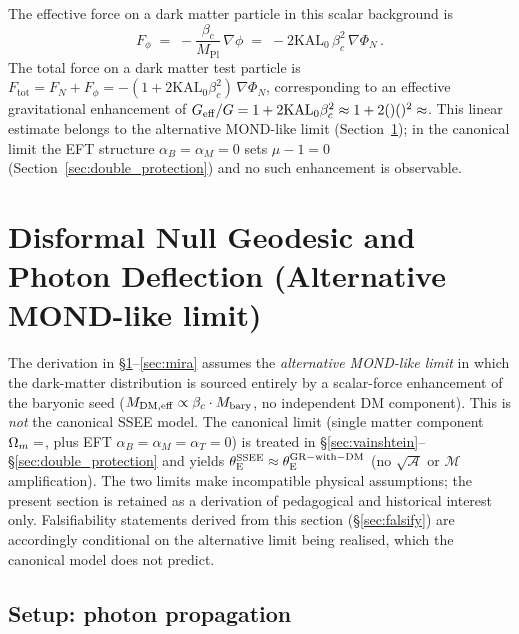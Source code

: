 \documentclass[12pt,a4paper]{article}
\newcommand{\KAL}{\mathrm{KAL}_0}
\newcommand{\MIRA}{\mathcal{M}}
\newcommand{\AURA}{\mathcal{A}}
\newcommand{\Mpl}{M_{\mathrm{Pl}}}
\newcommand{\bc}{\beta_c}
\newcommand{\thetaE}{\theta_{\mathrm{E}}}
\begin{document}
The effective force on a dark matter particle in this scalar background is
\begin{equation}
  F_\phi \;=\; -\frac{\bc}{\Mpl}\,\nabla\phi
         \;=\; -2\KAL\,\bc^2\,\nabla\Phi_N\,.
  \label{eq:scalar_force}
\end{equation}
The total force on a dark matter test particle is
$F_{\mathrm{tot}} = F_N + F_\phi = -(1 + 2\KAL\bc^2)\,\nabla\Phi_N$,
corresponding to an effective gravitational enhancement of
$G_{\mathrm{eff}}/G = 1 + 2\KAL\bc^2 \approx 1 + 2(\val{KAL0_d3})(\val{AURA_d3})^2
\approx \val{p8_Geff}$.
This linear estimate belongs to the alternative MOND-like limit
(Section~\ref{sec:geodesic}); in the canonical limit the EFT structure
$\alpha_B=\alpha_M=0$ sets $\mu-1=0$ (Section~\ref{sec:double_protection})
and no such enhancement is observable.

\section{Disformal Null Geodesic and Photon Deflection (Alternative MOND-like limit)}
\label{sec:geodesic}

\begin{tcolorbox}[colback=yellow!8,colframe=orange!60,title=Scope of this section]
The derivation in \S\ref{sec:geodesic}--\ref{sec:mira} assumes the
\emph{alternative MOND-like limit} in which the dark-matter distribution is
sourced entirely by a scalar-force enhancement of the baryonic seed
($M_{\rm DM,eff}\propto\bc\cdot M_{\rm bary}$, no independent DM
component). This is \emph{not} the canonical SSEE model. The canonical
limit (single matter component $\Omega_m=\val{OMEGA_M_TOTAL_d6}$, plus EFT
$\alpha_B=\alpha_M=\alpha_T=0$) is treated in
\S\ref{sec:vainshtein}--\S\ref{sec:double_protection} and yields
$\thetaE^{\rm SSEE}\approx\thetaE^{\rm GR-with-DM}$ (no $\sqrt{\AURA}$ or
$\MIRA$ amplification). The two limits make incompatible physical
assumptions; the present section is retained as a derivation of pedagogical
and historical interest only. Falsifiability statements derived from this
section (\S\ref{sec:falsify}) are accordingly conditional on the alternative
limit being realised, which the canonical model does not predict.
\end{tcolorbox}

\subsection{Setup: photon propagation}
\end{document}
